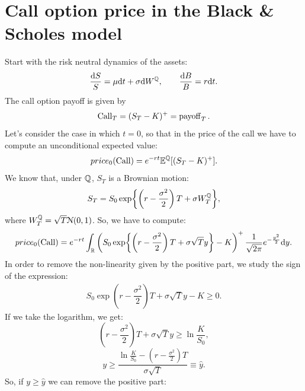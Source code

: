 \section{Call option price in the Black \& Scholes model}
Start with the risk neutral dynamics of the assets:
\begin{equation}
    \frac{\dd S}{S} = \mu\dd t + \sigma \dd W^{\mathbb{Q}}, \qquad \frac{\dd B}{B} = r\dd t.
\end{equation}
The call option payoff is given by
\begin{equation}
    \operatorname{Call}_T = (S_T - K)^+ = \operatorname{payoff}_T.
\end{equation}
Let's consider the case in which $t=0$, so that in the price of the call we have to compute an unconditional expected value:
\begin{equation}
    price_0(\operatorname{Call}) = e^{-rt}\mathbb{E}^{\mathbb{Q}}[(S_T-K)^+].
\end{equation}
We know that, under $\mathbb{Q}$, $S_T$ is a Brownian motion:
\begin{equation}
    S_T = S_0\exp{\left(r-\dfrac{\sigma^2}{2}\right)T+\sigma W_T^{\mathbb{Q}}},
\end{equation}
where $W_T^{\mathbb{Q}}=\sqrt{T}\mathcal{N}(0,1)$. So, we have to compute:
\begin{equation}
    price_0(\operatorname{Call}) = e^{-rt}\int_{\mathbb{R}}\left(S_0\exp{\left(r-\dfrac{\sigma^2}{2}\right)T+\sigma \sqrt{T}y}-K\right)^+\frac{1}{\sqrt{2\pi}}e^{-\frac{y^2}{2}}\dd y.
\end{equation}
In order to remove the non-linearity given by the positive part, we study the sign of the expression:
\begin{align}
    S_0\exp{\left(r-\dfrac{\sigma^2}{2}\right)T+\sigma \sqrt{T}y}-K \ge 0.
\end{align}
If we take the logarithm, we get:
\begin{equation*}
    \left(r-\dfrac{\sigma^2}{2}\right)T+\sigma \sqrt{T}y \ge \ln\frac{K}{S_0},
\end{equation*}
\begin{equation*}
    y \ge \dfrac{\ln\frac{K}{S_0} - \left(r-\frac{\sigma^2}{2}\right)T}{\sigma\sqrt{T}} \equiv \hat{y}.
\end{equation*}
So, if $y\ge\hat{y}$ we can remove the positive part:
